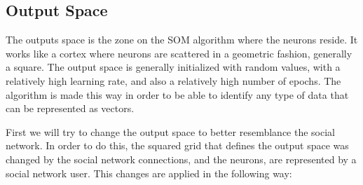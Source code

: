 \subsection{Output Space}
\label{sub:output_space}
The outputs space is the zone on the \ac{SOM} algorithm where the neurons reside. It works like a cortex where neurons are scattered in a geometric fashion, generally a square. The output space is generally initialized with random values, with a relatively high learning rate, and also a relatively high number of epochs. The algorithm is made this way in order to be able to identify any type of data that can be represented as vectors.

First we will try to change the output space to better resemblance the social network. In order to do this, the squared grid that defines the output space was changed by the social network connections, and the neurons, are represented by a social network user. This changes are applied in the following way:
